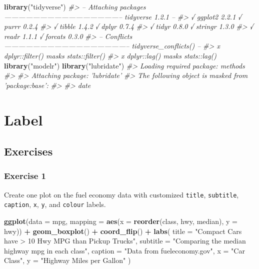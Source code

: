 \documentclass[]{book}
\newenvironment{Shaded}{\begin{snugshade}}{\end{snugshade}}
\newcommand{\CommentTok}[1]{\textcolor[rgb]{0.56,0.35,0.01}{\textit{#1}}}
\newcommand{\DataTypeTok}[1]{\textcolor[rgb]{0.13,0.29,0.53}{#1}}
\newcommand{\KeywordTok}[1]{\textcolor[rgb]{0.13,0.29,0.53}{\textbf{#1}}}
\newcommand{\NormalTok}[1]{#1}
\newcommand{\OperatorTok}[1]{\textcolor[rgb]{0.81,0.36,0.00}{\textbf{#1}}}
\newcommand{\StringTok}[1]{\textcolor[rgb]{0.31,0.60,0.02}{#1}}
\theoremstyle{definition}
\theoremstyle{definition}
\theoremstyle{definition}
\theoremstyle{remark}
\begin{document}
\begin{Shaded}
\begin{Highlighting}[]
\KeywordTok{library}\NormalTok{(}\StringTok{"tidyverse"}\NormalTok{)}
\CommentTok{#> -- Attaching packages -------------------------------------------------- tidyverse 1.2.1 --}
\CommentTok{#> √ ggplot2 2.2.1     √ purrr   0.2.4}
\CommentTok{#> √ tibble  1.4.2     √ dplyr   0.7.4}
\CommentTok{#> √ tidyr   0.8.0     √ stringr 1.3.0}
\CommentTok{#> √ readr   1.1.1     √ forcats 0.3.0}
\CommentTok{#> -- Conflicts ----------------------------------------------------- tidyverse_conflicts() --}
\CommentTok{#> x dplyr::filter() masks stats::filter()}
\CommentTok{#> x dplyr::lag()    masks stats::lag()}
\KeywordTok{library}\NormalTok{(}\StringTok{"modelr"}\NormalTok{)}
\KeywordTok{library}\NormalTok{(}\StringTok{"lubridate"}\NormalTok{)}
\CommentTok{#> Loading required package: methods}
\CommentTok{#> }
\CommentTok{#> Attaching package: 'lubridate'}
\CommentTok{#> The following object is masked from 'package:base':}
\CommentTok{#> }
\CommentTok{#>     date}
\end{Highlighting}
\end{Shaded}

\hypertarget{label}{%
\section{Label}\label{label}}

\hypertarget{exercises-7}{%
\subsection{Exercises}\label{exercises-7}}

\hypertarget{exercise-1-68}{%
\subsubsection{Exercise 1}\label{exercise-1-68}}

Create one plot on the fuel economy data with customized \texttt{title},
\texttt{subtitle}, \texttt{caption}, \texttt{x}, \texttt{y}, and
\texttt{colour} labels.

\begin{Shaded}
\begin{Highlighting}[]
\KeywordTok{ggplot}\NormalTok{(}\DataTypeTok{data =}\NormalTok{ mpg,}
       \DataTypeTok{mapping =} \KeywordTok{aes}\NormalTok{(}\DataTypeTok{x =} \KeywordTok{reorder}\NormalTok{(class, hwy, median), }\DataTypeTok{y =}\NormalTok{ hwy)) }\OperatorTok{+}\StringTok{ }
\StringTok{  }\KeywordTok{geom_boxplot}\NormalTok{() }\OperatorTok{+}
\StringTok{  }\KeywordTok{coord_flip}\NormalTok{() }\OperatorTok{+}
\StringTok{  }\KeywordTok{labs}\NormalTok{(}
    \DataTypeTok{title =} \StringTok{"Compact Cars have > 10 Hwy MPG than Pickup Trucks"}\NormalTok{,}
    \DataTypeTok{subtitle =} \StringTok{"Comparing the median highway mpg in each class"}\NormalTok{,}
    \DataTypeTok{caption =} \StringTok{"Data from fueleconomy.gov"}\NormalTok{,}
    \DataTypeTok{x =} \StringTok{"Car Class"}\NormalTok{,}
    \DataTypeTok{y =} \StringTok{"Highway Miles per Gallon"}
\NormalTok{  )}
\end{Highlighting}
\end{Shaded}
\end{document}
